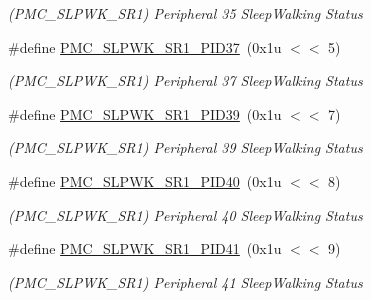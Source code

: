 \begin{DoxyCompactItemize}
\begin{DoxyCompactList}\small\item\em (P\+M\+C\+\_\+\+S\+L\+P\+W\+K\+\_\+\+S\+R1) Peripheral 35 Sleep\+Walking Status \end{DoxyCompactList}\item 
\mbox{\label{group__SAMS70__PMC_gac4237fa239f3feb2e392c03e6dc5ee25}} 
\#define \mbox{\hyperlink{group__SAMS70__PMC_gac4237fa239f3feb2e392c03e6dc5ee25}{P\+M\+C\+\_\+\+S\+L\+P\+W\+K\+\_\+\+S\+R1\+\_\+\+P\+I\+D37}}~(0x1u $<$$<$ 5)
\begin{DoxyCompactList}\small\item\em (P\+M\+C\+\_\+\+S\+L\+P\+W\+K\+\_\+\+S\+R1) Peripheral 37 Sleep\+Walking Status \end{DoxyCompactList}\item 
\mbox{\label{group__SAMS70__PMC_ga21c2dae73b4a4c28ecf39daa50391f67}} 
\#define \mbox{\hyperlink{group__SAMS70__PMC_ga21c2dae73b4a4c28ecf39daa50391f67}{P\+M\+C\+\_\+\+S\+L\+P\+W\+K\+\_\+\+S\+R1\+\_\+\+P\+I\+D39}}~(0x1u $<$$<$ 7)
\begin{DoxyCompactList}\small\item\em (P\+M\+C\+\_\+\+S\+L\+P\+W\+K\+\_\+\+S\+R1) Peripheral 39 Sleep\+Walking Status \end{DoxyCompactList}\item 
\mbox{\label{group__SAMS70__PMC_gaf6c8dbbddcffcae7dc4dfe25953829d3}} 
\#define \mbox{\hyperlink{group__SAMS70__PMC_gaf6c8dbbddcffcae7dc4dfe25953829d3}{P\+M\+C\+\_\+\+S\+L\+P\+W\+K\+\_\+\+S\+R1\+\_\+\+P\+I\+D40}}~(0x1u $<$$<$ 8)
\begin{DoxyCompactList}\small\item\em (P\+M\+C\+\_\+\+S\+L\+P\+W\+K\+\_\+\+S\+R1) Peripheral 40 Sleep\+Walking Status \end{DoxyCompactList}\item 
\mbox{\label{group__SAMS70__PMC_ga70b657db5cb6144083d30b99c43de6ee}} 
\#define \mbox{\hyperlink{group__SAMS70__PMC_ga70b657db5cb6144083d30b99c43de6ee}{P\+M\+C\+\_\+\+S\+L\+P\+W\+K\+\_\+\+S\+R1\+\_\+\+P\+I\+D41}}~(0x1u $<$$<$ 9)
\begin{DoxyCompactList}\small\item\em (P\+M\+C\+\_\+\+S\+L\+P\+W\+K\+\_\+\+S\+R1) Peripheral 41 Sleep\+Walking Status \end{DoxyCompactList}\item 

\end{DoxyCompactItemize}
